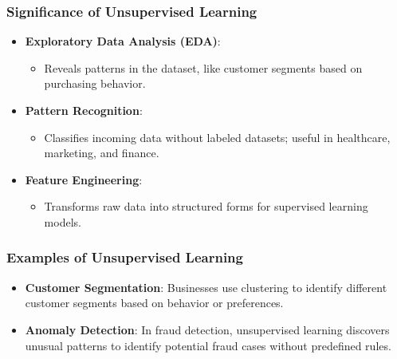 \documentclass[aspectratio=169]{beamer}
\begin{document}
\begin{frame}[fragile]
    \frametitle{Significance of Unsupervised Learning}
    \begin{itemize}
        \item \textbf{Exploratory Data Analysis (EDA)}:
        \begin{itemize}
            \item Reveals patterns in the dataset, like customer segments based on purchasing behavior.
        \end{itemize}

        \item \textbf{Pattern Recognition}:
        \begin{itemize}
            \item Classifies incoming data without labeled datasets; useful in healthcare, marketing, and finance.
        \end{itemize}

        \item \textbf{Feature Engineering}:
        \begin{itemize}
            \item Transforms raw data into structured forms for supervised learning models.
        \end{itemize}
    \end{itemize}
\end{frame}

\begin{frame}[fragile]
    \frametitle{Examples of Unsupervised Learning}
    \begin{itemize}
        \item \textbf{Customer Segmentation}:
        Businesses use clustering to identify different customer segments based on behavior or preferences.
        
        \item \textbf{Anomaly Detection}:
        In fraud detection, unsupervised learning discovers unusual patterns to identify potential fraud cases without predefined rules.
    \end{itemize}
\end{frame}
\end{document}
